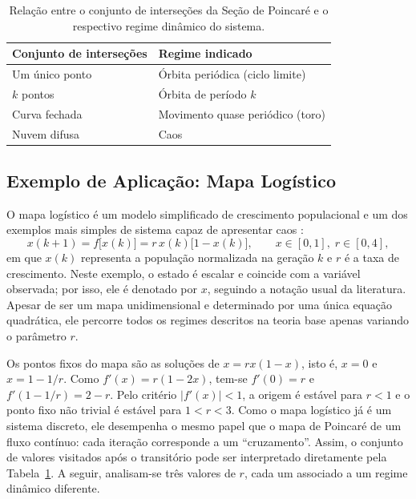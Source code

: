 \documentclass[]{article}
\begin{document}
	\begin{table}[htbp]
		\centering
		\caption{Relação entre o conjunto de interseções da Seção de Poincaré e o respectivo regime dinâmico do sistema.}
		\label{tab:poincare_regimes}
		\begin{tabular}{ll}
			\toprule
			\textbf{Conjunto de interseções} & \textbf{Regime indicado} \\
			\midrule
			Um único ponto & Órbita periódica (ciclo limite) \\
			$k$ pontos & Órbita de período $k$ \\
			Curva fechada & Movimento quase periódico (toro) \\
			Nuvem difusa & Caos \\
			\bottomrule
		\end{tabular}
	\end{table}

	\subsection{Exemplo de Aplicação: Mapa Logístico}
	\label{subsec:logistico}
	\noindent
	O mapa logístico é um modelo simplificado de crescimento populacional e um dos exemplos mais simples de sistema capaz de apresentar caos \cite{strogatz2015nonlinear, alligood1996chaos}:
	\begin{equation}
		x(k+1) = f\big[x(k)\big] = r\, x(k)\big[1 - x(k)\big], \qquad x \in [0, 1], \; r \in [0, 4],
	\end{equation}
	em que $x(k)$ representa a população normalizada na geração $k$ e $r$ é a taxa de crescimento. Neste exemplo, o estado é escalar e coincide com a variável observada; por isso, ele é denotado por $x$, seguindo a notação usual da literatura. Apesar de ser um mapa unidimensional e determinado por uma única equação quadrática, ele percorre todos os regimes descritos na teoria base apenas variando o parâmetro $r$.

	Os pontos fixos do mapa são as soluções de $x = r x(1 - x)$, isto é, $x = 0$ e $x = 1 - 1/r$. Como $f'(x) = r(1 - 2x)$, tem-se $f'(0) = r$ e $f'(1 - 1/r) = 2 - r$. Pelo critério $|f'(x)| < 1$, a origem é estável para $r < 1$ e o ponto fixo não trivial é estável para $1 < r < 3$. Como o mapa logístico já é um sistema discreto, ele desempenha o mesmo papel que o mapa de Poincaré de um fluxo contínuo: cada iteração corresponde a um ``cruzamento''. Assim, o conjunto de valores visitados após o transitório pode ser interpretado diretamente pela Tabela~\ref{tab:poincare_regimes}. A seguir, analisam-se três valores de $r$, cada um associado a um regime dinâmico diferente.
\end{document}
